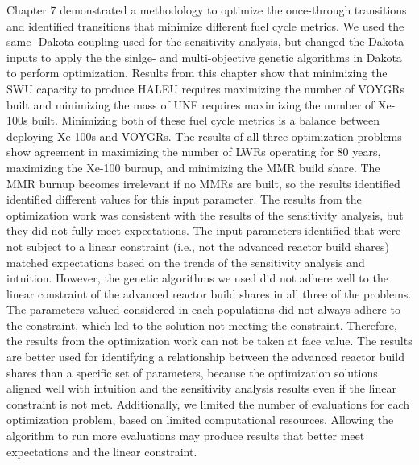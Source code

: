 Chapter 7 demonstrated a methodology to optimize the once-through 
transitions and identified transitions that minimize different 
fuel cycle metrics. We used the same \Cyclus-Dakota coupling used 
for the sensitivity analysis, but changed the Dakota inputs 
to apply the the sinlge- and multi-objective 
genetic algorithms in Dakota to perform optimization. 
Results from this chapter show that minimizing the 
\gls{SWU} capacity to produce \gls{HALEU} requires maximizing the number of 
VOYGRs built and minimizing the mass of \gls{UNF} requires maximizing the number 
of Xe-100s built. Minimizing both of these fuel cycle metrics is a 
balance between deploying Xe-100s and VOYGRs. The results of  
all three optimization problems show agreement in maximizing the number 
of \glspl{LWR} operating for 80 years, maximizing the Xe-100 burnup,
and minimizing the \gls{MMR} build share. The \gls{MMR} burnup becomes
irrelevant if no \glspl{MMR} are built, so the results identified 
identified different values for this input parameter. The results 
from the optimization 
work was consistent with the results of the sensitivity analysis, but 
they did not fully meet expectations. The input parameters identified that 
were not subject to a linear constraint (i.e., not the advanced reactor 
build shares) matched expectations based on the trends of the sensitivity 
analysis and intuition. However, the genetic algorithms we used 
did not adhere well to the linear constraint of the advanced reactor 
build shares in all three of the problems. The parameters valued 
considered in each populations did not always adhere to the constraint, 
which led to the solution not meeting the constraint. Therefore, the 
results from the optimization work can not be taken at face value. 
The results are better used for identifying a relationship between the advanced 
reactor build shares than a specific set of parameters, because the 
optimization solutions aligned well with intuition and the sensitivity 
analysis results even if the linear constraint is not met. Additionally, 
we limited the number of evaluations for each optimization problem,
based on limited computational resources. Allowing the 
algorithm to run more evaluations may produce results that better 
meet expectations and the linear constraint. 

